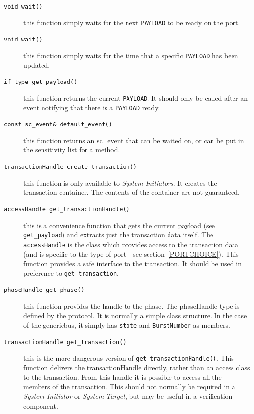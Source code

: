 \documentclass[12pt,oneside]{gsbook}
\newcommand{\master}{{\em System Initiator}\xspace}
\newcommand{\masters}{{\em System Initiators}\xspace}
\newcommand{\slave}{{\em System Target}\xspace}
\begin{document}
\begin{description}
\item[{\tt  void wait()}] this function simply waits for the next
{\tt PAYLOAD} to be ready on the port.

\item[{\tt  void wait()}] this function simply waits for the time that
a specific {\tt PAYLOAD} has been updated.

\item[{\tt if\_type get\_payload()}] this function returns the current
{\tt PAYLOAD}. It should only be called after an event notifying that
there is a {\tt PAYLOAD} ready.

\item[{\tt const sc\_event\& default\_event() }] this function returns an
sc\_event that can be waited on, or can be put in the sensitivity list
for a method.

\item[{\tt  transactionHandle create\_transaction()}] this function is
only available to \masters. It creates the transaction container. The
contents of the container are not guaranteed.
  
\item[{\tt   accessHandle get\_transactionHandle()}] this is a
convenience function that gets the current payload (see {\tt
get\_payload}) and extracts just the transaction data itself. The {\tt
accessHandle} is the class which provides access to the transaction
data (and is specific to the type of port - see
section~\ref{PORTCHOICE}). This function provides a safe interface to
the transaction. It should be used in preference to {\tt get\_transaction}.

\item[{\tt   phaseHandle get\_phase() }] this function provides the
handle to the phase. The phaseHandle type is defined by the
protocol. It is normally a simple class structure. In the case of the
genericbus, it simply has {\tt state} and {\tt BurstNumber} as
members.

\item[{\tt transactionHandle get\_transaction()}] this is the more
dangerous version of {\tt get\_transactionHandle()}. This function
delivers the transactionHandle directly, rather than an access class
to the transaction. From this handle it is possible to access all the
members of the transaction. This should not normally be required in a
\master or \slave, but may be useful in a verification component.

\end{description}
\end{document}
